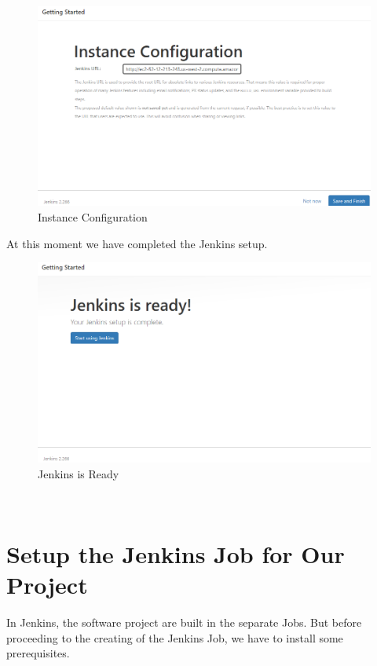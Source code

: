 \documentclass[12pt,a4paper,twoside]{article}
\begin{document}
\begin{figure}[H]
    \centering
        \includegraphics[width=15cm]{images-aws/25-jenkins-conf.png}
        \caption{Instance Configuration}
\end{figure}


At this moment we have completed the Jenkins setup.


\begin{figure}[H]
    \centering
        \includegraphics[width=15cm]{images-aws/26-jenkins-ready.png}
        \caption{Jenkins is Ready}
\end{figure}


~\newpage


\section{Setup the Jenkins Job for Our Project}


In Jenkins, the software project are built in the separate Jobs. 
But before proceeding to the creating of the Jenkins Job, we have to install some prerequisites. 
\end{document}

